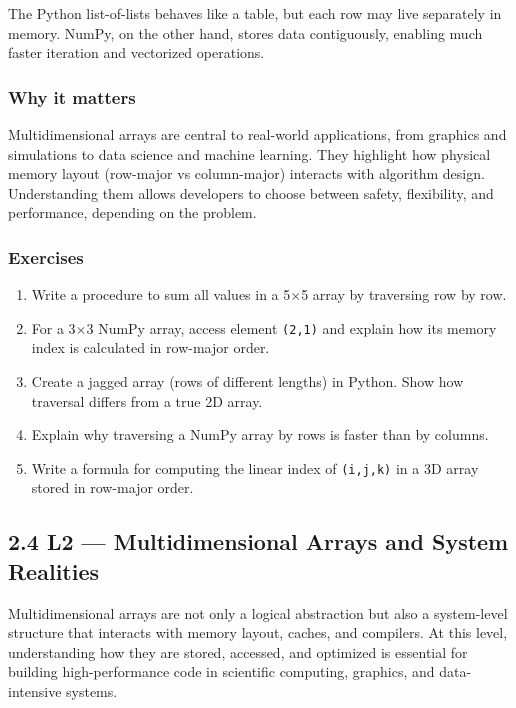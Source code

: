 \documentclass[
  letterpaper,
  DIV=11,
  numbers=noendperiod]{scrreprt}
\providecommand{\tightlist}{%
  \setlength{\itemsep}{0pt}\setlength{\parskip}{0pt}}
\begin{document}
The Python list-of-lists behaves like a table, but each row may live
separately in memory. NumPy, on the other hand, stores data
contiguously, enabling much faster iteration and vectorized operations.

\subsubsection{Why it matters}\label{why-it-matters-22}

Multidimensional arrays are central to real-world applications, from
graphics and simulations to data science and machine learning. They
highlight how physical memory layout (row-major vs column-major)
interacts with algorithm design. Understanding them allows developers to
choose between safety, flexibility, and performance, depending on the
problem.

\subsubsection{Exercises}\label{exercises-22}

\begin{enumerate}
\def\labelenumi{\arabic{enumi}.}
\tightlist
\item
  Write a procedure to sum all values in a 5×5 array by traversing row
  by row.
\item
  For a 3×3 NumPy array, access element \texttt{(2,1)} and explain how
  its memory index is calculated in row-major order.
\item
  Create a jagged array (rows of different lengths) in Python. Show how
  traversal differs from a true 2D array.
\item
  Explain why traversing a NumPy array by rows is faster than by
  columns.
\item
  Write a formula for computing the linear index of \texttt{(i,j,k)} in
  a 3D array stored in row-major order.
\end{enumerate}

\subsection{2.4 L2 --- Multidimensional Arrays and System
Realities}\label{l2-multidimensional-arrays-and-system-realities}

Multidimensional arrays are not only a logical abstraction but also a
system-level structure that interacts with memory layout, caches, and
compilers. At this level, understanding how they are stored, accessed,
and optimized is essential for building high-performance code in
scientific computing, graphics, and data-intensive systems.
\end{document}
